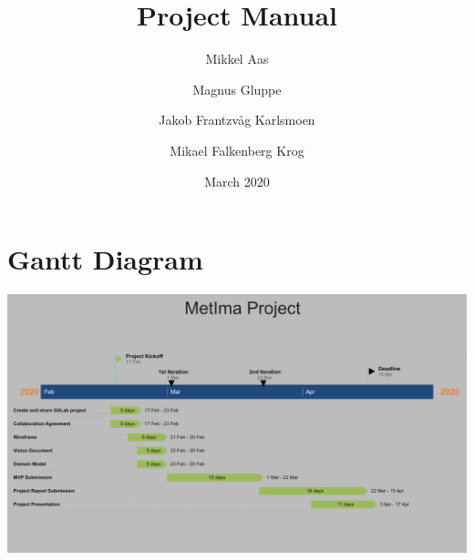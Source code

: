 \documentclass{article}
\title{Project Manual}
\author{Mikkel Aas \and Magnus Gluppe \and Jakob Frantzvåg Karlsmoen \and Mikael Falkenberg Krog}
\date{March 2020}
\begin{document}
\maketitle


\section*{Gantt Diagram}
\includegraphics[width=\textwidth]{Gantt_Diagram.png}



\end{document}
